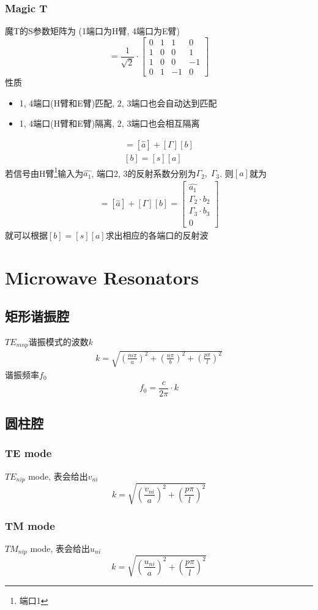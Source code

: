 \documentclass[a4paper]{report}
\begin{document}
\subsection{Magic T}
魔T的S参数矩阵为 (1端口为H臂, 4端口为E臂)
\begin{equation}
  [s]=\frac{1}{\sqrt{2}}\cdot\begin{bmatrix}
    0&1&1&0
    \\ 1&0&0&1
    \\ 1&0&0&-1
    \\ 0&1&-1&0
  \end{bmatrix}
\end{equation}
性质
\begin{itemize}
  \item 1, 4端口(H臂和E臂)匹配, 2, 3端口也会自动达到匹配
  \item 1, 4端口(H臂和E臂)隔离, 2, 3端口也会相互隔离
\end{itemize}
\begin{align*}
  [a]=[\hat{a}]+[\Gamma] [b]
  \\ [b]=[s] [a]
\end{align*}
若信号由H臂\footnote{端口1}输入为$\hat{a_1}$, 端口2, 3的反射系数分别为$\Gamma_2,\; \Gamma_3$. 则$[a]$就为
\begin{gather}
  [a]=[\hat{a}]+[\Gamma] [b]=\begin{bmatrix}
    \hat{a_1}\\
    \Gamma_2 \cdot b_2
    \\ \Gamma_3 \cdot b_3
    \\ 0
  \end{bmatrix}
\end{gather}
就可以根据$[b]=[s][a]$求出相应的各端口的反射波


\chapter{Microwave Resonators}
\section{矩形谐振腔}
$TE_{mnp}$谐振模式的波数$k$
\begin{align*}
  k=\sqrt{(\frac{m\pi}{a})^2+(\frac{n\pi}{b})^2+(\frac{p\pi}{l})^2}
\end{align*}
谐振频率$f_0$
$$f_0=\frac{c}{2\pi}\cdot k$$
\section{圆柱腔}
\subsection{TE mode}
$TE_{nip}$ mode, 表会给出$v_{ni}$
$$k=\sqrt{(\frac{v_{ni}}{a})^2+(\frac{p\pi}{l})^2}$$
\subsection{TM mode}
$TM_{nip}$ mode, 表会给出$u_{ni}$
$$k=\sqrt{(\frac{u_{ni}}{a})^2+(\frac{p\pi}{l})^2}$$
\end{document}
